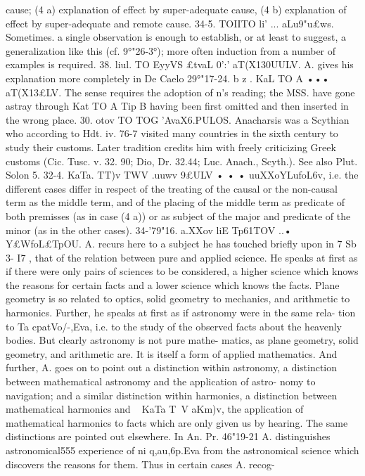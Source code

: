 {{{{{{{{{{{{{{cause; (4 a) explanation of effect by super-adequate cause, (4 b)
explanation of effect by super-adequate and remote cause.
34-5. TOIITO li' ... aLu9"u£ws. Sometimes. a single observation
is enough to establish, or at least to suggest, a generalization like
this (cf. 9°"26-3°); more often induction from a number of
examples is required.
38. liul. TO EyyVS £tvaL 0':' aT(X130UULV. A. gives his explanation
more completely in De Caelo 29°"17-24.
b z . KaL TO A ••• aT(X13£LV. The sense requires the adoption of
n's reading; the MSS. have gone astray through Kat TO A Tip B
having been first omitted and then inserted in the wrong place.
30. otov TO TOG 'AvaX6.PULOS. Anacharsis was a Scythian who
according to Hdt. iv. 76-7 visited many countries in the sixth
century to study their customs. Later tradition credits him with
freely criticizing Greek customs (Cic. Tusc. v. 32. 90; Dio, Dr.
32.44; Luc. Anach., Scyth.). See also Plut. Solon 5.
32-4. KaTa. TT)v TWV .uuwv 9£ULV • • • uuXXoYLufoL6v, i.e. the
different cases differ in respect of the treating of the causal or
the non-causal term as the middle term, and of the placing of the
middle term as predicate of both premisses (as in case (4 a)) or
as subject of the major and predicate of the minor (as in the
other cases).
34-'79"16. a.XXov liE Tp61TOV ..• Y£WfoL£TpOU. A. recurs here to
a subject he has touched briefly upon in 7 Sb 3- I7 , that of the
relation between pure and applied science. He speaks at first as
if there were only pairs of sciences to be considered, a higher
science which knows the reasons for certain facts and a lower
science which knows the facts. Plane geometry is so related to
optics, solid geometry to mechanics, and arithmetic to harmonics.
Further, he speaks at first as if astronomy were in the same rela-
tion to Ta cpatVo/-,Eva, i.e. to the study of the observed facts about
the heavenly bodies. But clearly astronomy is not pure mathe-
matics, as plane geometry, solid geometry, and arithmetic are.
It is itself a form of applied mathematics. And further, A. goes
on to point out a distinction within astronomy, a distinction
between mathematical astronomy and the application of astro-
nomy to navigation; and a similar distinction within harmonics,
a distinction between mathematical harmonics and ~ KaTa T~V
aKm)v, the application of mathematical harmonics to facts which
are only given us by hearing. The same distinctions are pointed
out elsewhere. In An. Pr. 46"19-21 A. distinguishes astronomical555
experience of ni q,au,6p.Eva from the astronomical science which
discovers the reasons for them. Thus in certain cases A. recog-
}}}}}}}}}}}}}}
